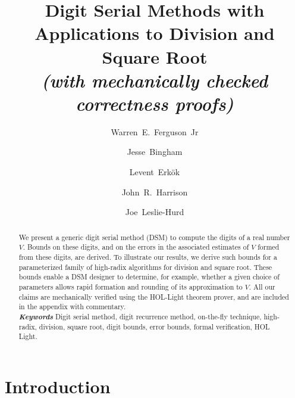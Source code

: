 \documentclass[10pt]{article}
\theoremstyle{definition}
\theoremstyle{remark}
\numberwithin{equation}{section}
\begin{document}
	
\title{Digit Serial Methods with Applications to Division and Square Root\\ {\large \it (with mechanically checked correctness proofs)}}

\author[1]{Warren~E.~Ferguson~Jr}
\author[2]{Jesse~Bingham}
\author[2]{Levent~Erk\"{o}k}
\author[2]{John~R.~Harrison}
\author[2]{Joe~Leslie-Hurd}
\renewcommand\Authands{ and }

\maketitle

%
%
%


\begin{abstract}
We present a generic digit serial method (DSM) to compute the digits of a real number $V$.
Bounds on these digits, and on the errors in the associated estimates of $V$ formed from these digits, are derived.
To illustrate our results, we derive such bounds for a parameterized family of high-radix algorithms for division and square root.
These bounds enable a DSM designer to determine, for example, whether a given choice of parameters allows rapid formation and rounding of its approximation to $V$. All our claims are mechanically verified using the HOL-Light theorem prover, and are included in the appendix with commentary.
\\

\noindent \textbf{\textit{Keywords}}
Digit serial method, digit recurrence method, on-the-fly technique, high-radix, division, square root, digit bounds, error bounds, formal verification, HOL Light.
\end{abstract}

\section{Introduction\label{sec:introduction}}
\end{document}
